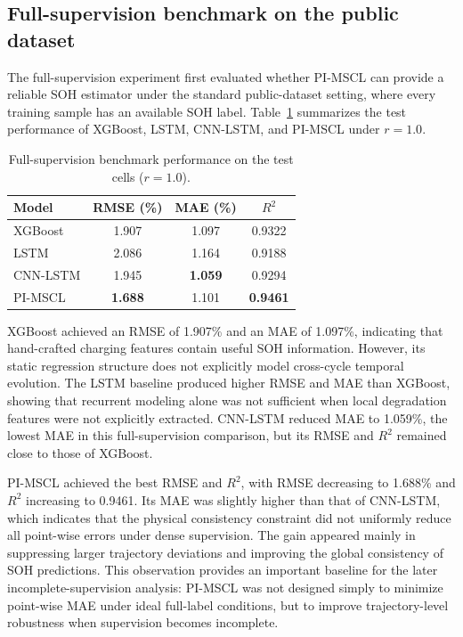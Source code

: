 \documentclass[pdflatex,sn-mathphys-num]{sn-jnl}
\begin{document}
\iffalse
\subsection{Full-supervision benchmark on the public dataset}
\label{subsec:full_supervision_results}

The full-supervision experiment first evaluated whether PI-MSCL can provide a reliable SOH estimator under the standard public-dataset setting, where every training sample has an available SOH label. Table~\ref{tab:full_supervision} summarizes the test performance of XGBoost, LSTM, CNN-LSTM, and PI-MSCL under $r=1.0$.

\begin{table}[t]
\caption{Full-supervision benchmark performance on the test cells ($r=1.0$).}
\label{tab:full_supervision}
\centering
\begin{tabular}{lccc}
\toprule
Model & RMSE (\%) & MAE (\%) & $R^2$ \\
\midrule
XGBoost & 1.907 & 1.097 & 0.9322 \\
LSTM & 2.086 & 1.164 & 0.9188 \\
CNN-LSTM & 1.945 & \textbf{1.059} & 0.9294 \\
PI-MSCL & \textbf{1.688} & 1.101 & \textbf{0.9461} \\
\bottomrule
\end{tabular}
\end{table}

XGBoost achieved an RMSE of 1.907\% and an MAE of 1.097\%, indicating that hand-crafted charging features contain useful SOH information. However, its static regression structure does not explicitly model cross-cycle temporal evolution. The LSTM baseline produced higher RMSE and MAE than XGBoost, showing that recurrent modeling alone was not sufficient when local degradation features were not explicitly extracted. CNN-LSTM reduced MAE to 1.059\%, the lowest MAE in this full-supervision comparison, but its RMSE and $R^2$ remained close to those of XGBoost.

PI-MSCL achieved the best RMSE and $R^2$, with RMSE decreasing to 1.688\% and $R^2$ increasing to 0.9461. Its MAE was slightly higher than that of CNN-LSTM, which indicates that the physical consistency constraint did not uniformly reduce all point-wise errors under dense supervision. The gain appeared mainly in suppressing larger trajectory deviations and improving the global consistency of SOH predictions. This observation provides an important baseline for the later incomplete-supervision analysis: PI-MSCL was not designed simply to minimize point-wise MAE under ideal full-label conditions, but to improve trajectory-level robustness when supervision becomes incomplete.
\end{document}
